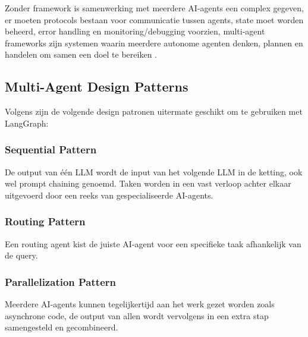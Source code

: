 Zonder framework is samenwerking met meerdere AI-agents een complex gegeven, er moeten protocols bestaan voor communicatie tussen agents, state moet worden beheerd, error handling en monitoring/debugging voorzien, multi-agent frameworks zijn systemen waarin meerdere autonome agenten denken, plannen en handelen om samen een doel te bereiken \autocite{IBM2026}.

\subsection{Multi-Agent Design Patterns}
\label{ssec:multiagentdesignpatterns}




Volgens \textcite{IBM2026} zijn de volgende design patronen uitermate geschikt om te gebruiken met LangGraph:

\subsubsection{Sequential Pattern}
\label{sssec:sequentialpattern}
De output van één LLM wordt de input van het volgende LLM in de ketting, ook wel prompt chaining genoemd. Taken worden in een vast verloop achter elkaar uitgevoerd door een reeks van gespecialiseerde AI-agents.

\subsubsection{Routing Pattern}
\label{sssec:routingpattern}
Een routing agent kist de juiste AI-agent voor een specifieke taak afhankelijk van de query.

\subsubsection{Parallelization Pattern}
\label{sssec:parallelizationpattern}
Meerdere AI-agents kunnen tegelijkertijd aan het werk gezet worden zoals asynchrone code, de output van allen wordt vervolgens in een extra stap samengesteld en gecombineerd.

